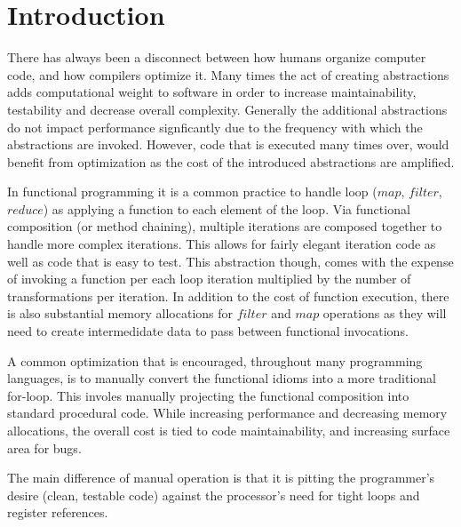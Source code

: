 \section{Introduction}
There has always been a disconnect between how humans organize computer code, and how compilers optimize it.  Many times the act of creating abstractions adds computational weight to software in order to increase maintainability, testability and decrease overall complexity.  Generally the additional abstractions do not impact performance signficantly due to the frequency with which the abstractions are invoked.  However, code that is executed many times over, would benefit from optimization as the cost of the introduced abstractions are amplified.  

In functional programming it is a common practice to handle loop ($map$, $filter$, $reduce$) as applying a function to each element of the loop.  Via functional composition (or method chaining), multiple iterations are composed together to handle more complex iterations.  This allows for fairly elegant iteration code as well as code that is easy to test.  This abstraction though, comes with the expense of invoking a function per each loop iteration multiplied by the number of transformations per iteration. In addition to the cost of function execution, there is also substantial memory allocations for $filter$ and $map$ operations as they will need to create intermedidate data to pass between functional invocations.  

A common optimization that is encouraged, throughout many programming languages, is to manually convert the functional idioms into a more traditional for-loop.  This involes manually projecting the functional composition into standard procedural code.  While increasing performance and decreasing memory allocations, the overall cost is tied to code maintainability, and increasing surface area for bugs.  

The main difference of manual operation is that it is pitting the programmer's desire (clean, testable code) against the processor's need for tight loops and register references.  